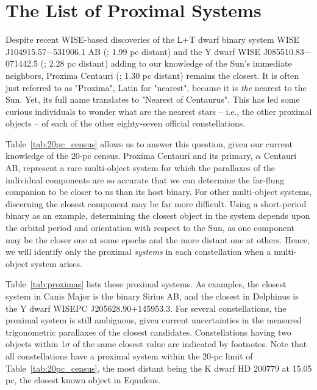 \documentclass[twocolumn,tighten,twocolappendix]{aastex631}
\begin{document}
\pagebreak

\section{The List of Proximal Systems\label{sec:appendix_proximas}}

Despite recent WISE-based discoveries of the L+T dwarf binary system WISE J104915.57$-$531906.1 AB (\citealt{luhman2013}; 1.99 pc distant) and the Y dwarf WISE J085510.83$-$071442.5 (\citealt{luhman2014}; 2.28 pc distant) adding to our knowledge of the Sun's immediate neighbors, Proxima Centauri (\citealt{innes1915}; 1.30 pc distant) remains the closest. It is often just referred to as "Proxima", Latin for "nearest", because it is {\it the} nearest to the Sun. Yet, its full name translates to "Nearest of Centaurus". This has led some curious individuals to wonder what are the nearest stars -- i.e., the other proximal objects -- of each of the other eighty-seven official constellations.

Table~\ref{tab:20pc_census} allows us to answer this question, given our current knowledge of the 20-pc census. Proxima Centauri and its primary, $\alpha$ Centauri AB, represent a rare multi-object system for which the parallaxes of the individual components are so accurate that we can determine the far-flung companion to be closer to us than its host binary. For other multi-object systems, discerning the closest component may be far more difficult. Using a short-period binary as an example, determining the closest object in the system depends upon the orbital period and orientation with respect to the Sun, as one component may be the closer one at some epochs and the more distant one at others. Hence, we will identify only the proximal {\it systems} in each constellation when a multi-object system arises.

Table~\ref{tab:proximas} lists these proximal systems. As examples, the closest system in Canis Major is the binary Sirius AB, and the closest in Delphinus is the Y dwarf WISEPC J205628.90+145953.3. For several constellations, the proximal system is still ambiguous, given current uncertainties in the measured trigonometric parallaxes of the closest candidates. Constellations having two objects within 1$\sigma$ of the same closest value are indicated by footnotes. Note that all constellations have a proximal system within the 20-pc limit of Table~\ref{tab:20pc_census}, the most distant being the K dwarf HD 200779 at 15.05 pc, the closest known object in Equuleus.
\end{document}

